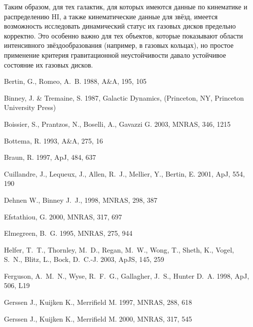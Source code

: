 \documentclass[russian,12pt]{article}
\begin{document}
Таким образом, для тех галактик, для которых имеются данные по 
кинематике и распределению HI, а также кинематические данные для звёзд, 
имеется возможность исследовать динамический статус их газовых дисков 
предельно корректно. Это особенно важно для тех объектов, которые 
показывают области интенсивного звёздообразования (например, в газовых 
кольцах), но простое применение критерия гравитационной неустойчивости 
давало устойчивое состояние их газовых дисков. 

\begin{thebibliography}{99}

    {Bertin}, G., {Romeo}, A.~B. 1988, A\&A, 195, 105

    {Binney}, J. \& {Tremaine}, S. 1987, Galactic Dynamics, 
    (Princeton, NY, Princeton University Press)

    {Boissier}, S., {Prantzos}, N., {Boselli}, A., 
    {Gavazzi} G. 2003, MNRAS, 346, 1215

    {Bottema}, R. 1993, A\&A, 275, 16

    {Braun}, R. 1997, ApJ, 484, 637

    {Cuillandre}, J., {Lequeux}, J., {Allen}, R.~J., {Mellier}, Y., 
    {Bertin}, E. 2001, ApJ, 554, 190
  
    {Dehnen} W., {Binney} J.~J., 1998, MNRAS, 298, 387
  
    {Efstathiou}, G. 2000, MNRAS, 317, 697

    {Elmegreen}, B.~G. 1995, MNRAS, 275, 944

    {Helfer}, T.~T., {Thornley}, M.~D., {Regan}, M.~W., {Wong}, T., 
    {Sheth}, K., {Vogel}, S.~N., {Blitz}, L., {Bock}, D.~C.-J. 
    2003, ApJS, 145, 259

    {Ferguson}, A.~M.~N., {Wyse}, R.~F.~G., {Gallagher}, J.~S., 
    {Hunter} D.~A. 1998, ApJ, 506, L19

    {Gerssen} J., {Kuijken} K., {Merrifield} M. 1997, MNRAS, 288, 618

    {Gerssen} J., {Kuijken} K., {Merrifield} M. 2000, MNRAS, 317, 545


\end{thebibliography}
\end{document}
